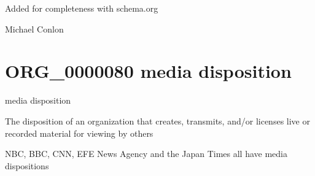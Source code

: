 \documentclass[letterpaper,10pt,english]{sphinxmanual}
\begin{document}
\begin{sphinxShadowBox}

\sphinxAtStartPar
Added for completeness with schema.org
\end{sphinxShadowBox}

\begin{sphinxShadowBox}

\sphinxAtStartPar
Michael Conlon 
\end{sphinxShadowBox}
\begin{quote}
\label{\detokenize{doc-ORG_0000080:org-0000080}}\label{\detokenize{doc-ORG_0000080:media-disposition}}\label{\detokenize{doc-ORG_0000080:org-0000080}}
\ignorespaces \end{quote}


\section{ORG\_0000080 \sphinxhyphen{} media disposition}
\label{\detokenize{doc-ORG_0000080:org-0000080-media-disposition}}\label{\detokenize{doc-ORG_0000080:index-0}}\label{\detokenize{doc-ORG_0000080::doc}}
\begin{sphinxShadowBox}

\sphinxAtStartPar
media disposition
\end{sphinxShadowBox}

\begin{sphinxShadowBox}

\sphinxAtStartPar
The disposition of an organization that creates, transmits, and/or licenses live or recorded material for viewing by others
\end{sphinxShadowBox}

\begin{sphinxShadowBox}

\sphinxAtStartPar
{}
\end{sphinxShadowBox}

\begin{sphinxShadowBox}

\sphinxAtStartPar
NBC, BBC, CNN, EFE News Agency and the Japan Times all have media dispositions
\end{sphinxShadowBox}
\end{document}

